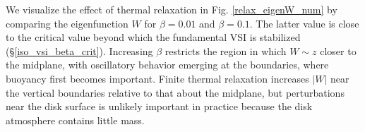 

We visualize the effect of thermal relaxation in 
Fig. \ref{relax_eigenW_num} by comparing the eigenfunction $W$ for
$\beta=0.01$ and $\beta=0.1$. The latter value is close to the
critical value beyond which the fundamental VSI is stabilized
(\S\ref{iso_vsi_beta_crit}). Increasing $\beta$ 
restricts  the region in which $W\sim z$ closer to the midplane, with
oscillatory behavior emerging at the boundaries, where buoyancy first
becomes important. Finite thermal relaxation increases $|W|$ near the
vertical boundaries relative to that about the midplane, but
perturbations near the disk surface is unlikely important in practice
because the disk atmosphere contains little mass. 



